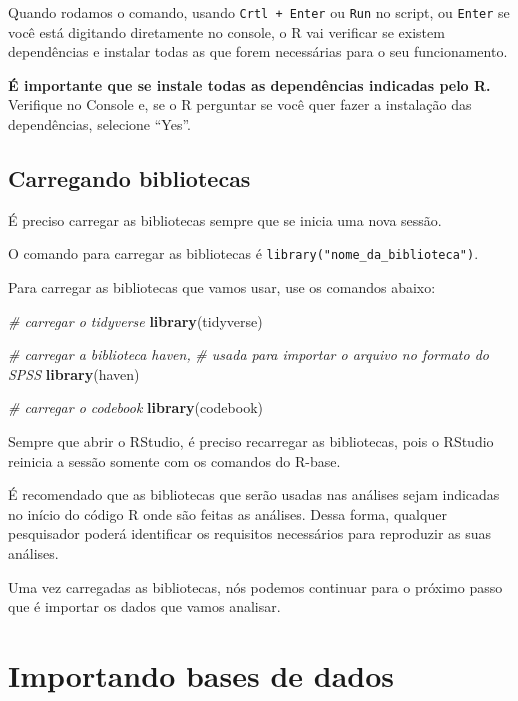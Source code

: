 \documentclass[
  10pt,
  brazil,
  a4paper,
  twoside, notitlepage, openright]{book}
\newenvironment{Shaded}{\begin{snugshade}}{\end{snugshade}}
\newcommand{\CommentTok}[1]{\textcolor[rgb]{0.56,0.35,0.01}{\textit{#1}}}
\newcommand{\KeywordTok}[1]{\textcolor[rgb]{0.13,0.29,0.53}{\textbf{#1}}}
\newcommand{\NormalTok}[1]{#1}
\begin{document}
Quando rodamos o comando, usando \texttt{Crtl\ +\ Enter} ou \texttt{Run} no script, ou \texttt{Enter} se você está digitando diretamente no console, o R vai verificar se existem dependências e instalar todas as que forem necessárias para o seu funcionamento.

\textbf{É importante que se instale todas as dependências indicadas pelo R.} Verifique no Console e, se o R perguntar se você quer fazer a instalação das dependências, selecione ``Yes''.

\hypertarget{carregando-bibliotecas}{%
\section{Carregando bibliotecas}\label{carregando-bibliotecas}}

É preciso carregar as bibliotecas sempre que se inicia uma nova sessão.

O comando para carregar as bibliotecas é \texttt{library("nome\_da\_biblioteca")}.

Para carregar as bibliotecas que vamos usar, use os comandos abaixo:

\begin{Shaded}
\begin{Highlighting}[]
\CommentTok{# carregar o tidyverse}
\KeywordTok{library}\NormalTok{(tidyverse)}

\CommentTok{# carregar a biblioteca haven, }
\CommentTok{# usada para importar o arquivo  no formato do SPSS }
\KeywordTok{library}\NormalTok{(haven)}

\CommentTok{# carregar o codebook}
\KeywordTok{library}\NormalTok{(codebook)}
\end{Highlighting}
\end{Shaded}

Sempre que abrir o RStudio, é preciso recarregar as bibliotecas, pois o RStudio reinicia a sessão somente com os comandos do R-base.

É recomendado que as bibliotecas que serão usadas nas análises sejam indicadas no início do código R onde são feitas as análises. Dessa forma, qualquer pesquisador poderá identificar os requisitos necessários para reproduzir as suas análises.

Uma vez carregadas as bibliotecas, nós podemos continuar para o próximo passo que é importar os dados que vamos analisar.

\hypertarget{importando-bases-de-dados}{%
\chapter{Importando bases de dados}\label{importando-bases-de-dados}}
\end{document}
